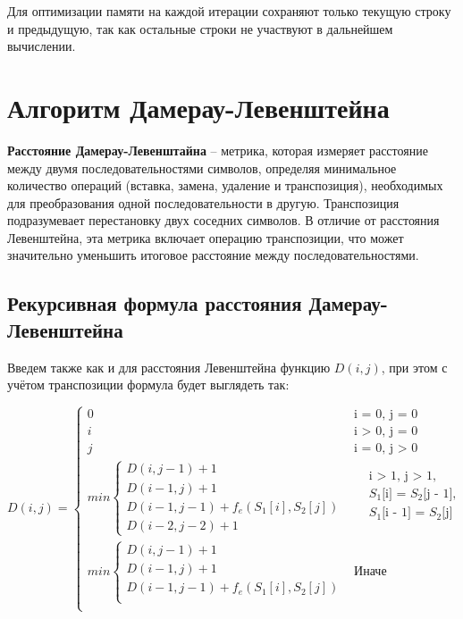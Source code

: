 Для оптимизации памяти на каждой итерации сохраняют только текущую строку и предыдущую, так как остальные строки не участвуют в дальнейшем вычислении.\cite{algs}

\section{Алгоритм Дамерау-Левенштейна}

\textbf{Расстояние Дамерау-Левенштайна} -- метрика, которая измеряет расстояние между двумя последовательностями символов, определяя минимальное количество операций (вставка, замена, удаление и транспозиция), необходимых для преобразования одной последовательности в другую. Транспозиция подразумевает перестановку двух соседних символов. В отличие от расстояния Левенштейна, эта метрика включает операцию транспозиции, что может значительно уменьшить итоговое расстояние между последовательностями.

\subsection{Рекурсивная формула расстояния Дамерау-Левенштейна}

Введем также как и для расстояния Левенштейна функцию $D(i, j)$, при этом с учётом транспозиции формула будет выглядеть так:

\begin{equation}
	\label{eq:Dd}
	D(i, j) = 
	\begin{cases}
		0 &\text{i = 0, j = 0}\\
		i &\text{i > 0, j = 0}\\
		j &\text{i = 0, j > 0}\\
		min \begin{cases}
			D(i, j - 1) + 1\\
			D(i - 1, j) + 1\\
			D(i - 1, j - 1) + f_e(S_1[i], S_2[j])\\
			D(i - 2, j - 2) + 1
		\end{cases} & \begin{aligned}
		&\text{i > 1,  j > 1,} \\ 
		&\text{$S_1$[i] = $S_2$[j - 1],} \\
		&\text{$S_1
  $[i - 1] = $S_2$[j]} \\
		\end{aligned} \\
		min \begin{cases}
			D(i, j - 1) + 1\\
			D(i - 1, j) + 1\\
			D(i - 1, j - 1) + f_e(S_1[i], S_2[j])\\
		\end{cases} & \text{Иначе}\\
	\end{cases}
\end{equation}

